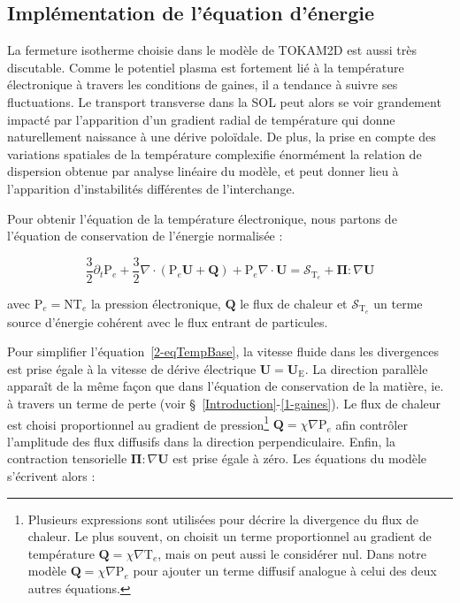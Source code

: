 \begin{refsection}
	\subsection{Implémentation de l'équation d'énergie}
	La fermeture isotherme choisie dans le modèle de TOKAM2D est aussi très
	discutable. Comme le potentiel plasma est fortement lié à la température
	électronique à travers les conditions de gaines, il a tendance à suivre ses
	fluctuations. Le transport transverse dans la SOL peut alors se voir grandement
	impacté par l'apparition d'un gradient radial de température qui donne
	naturellement naissance à une dérive poloïdale. De plus, la prise en compte des
	variations spatiales de la température complexifie énormément la relation de
	dispersion obtenue par analyse linéaire du modèle, et peut donner lieu à
	l'apparition d'instabilités différentes de l'interchange.
	
	Pour obtenir l'équation de la température électronique, nous partons de
	l'équation de conservation de l'énergie normalisée :
	
	\begin{equation} 
	\label{2-eqTempBase}
		\frac{3}{2}\partial_t \text{P}_e +
		\frac{3}{2}\nabla\cdot\left(\text{P}_e\mathbf{U}+\mathbf{Q}\right) +
		\text{P}_e\nabla\cdot\mathbf{U}=\mathcal{S}_{\text{T}_e} +
		\mathbf{\Pi}:\nabla \mathbf U
	\end{equation}
	
	avec $\text{P}_e=\text{NT}_e$ la pression électronique, $\mathbf{Q}$ le
	flux de chaleur et $\mathcal{S}_{\text{T}_e}$ un terme source d'énergie
	cohérent avec le flux entrant de particules. 
	
	Pour simplifier l'équation~\ref{2-eqTempBase}, la vitesse
	fluide dans les divergences est prise égale à la vitesse de dérive électrique $\mathbf
	U=\mathbf U_\text{E}$. La direction parallèle apparaît de la même façon que
	dans l'équation de conservation de la matière, ie. à travers un terme de
	perte (voir \S~\ref{Introduction}-\ref{1-gaines}). Le flux de chaleur est
	choisi proportionnel au gradient de pression\footnote{Plusieurs expressions
	sont utilisées pour décrire la divergence du flux de chaleur. Le plus souvent,
	on choisit un terme proportionnel au gradient de température 
$\mathbf{Q}=\chi\nabla\text{T}_e$, mais on peut aussi le considérer nul. Dans
notre modèle $\mathbf{Q}=\chi\nabla\text{P}_e$ pour ajouter un terme diffusif
analogue à celui des deux autres équations.} $\mathbf{Q}=\chi\nabla\text{P}_e$
afin contrôler l'amplitude des flux diffusifs dans la direction perpendiculaire.
	Enfin, la contraction tensorielle $\mathbf{\Pi}:\nabla \mathbf U$ est
	prise égale à zéro. Les équations du modèle s'écrivent alors :
	

\end{refsection}
